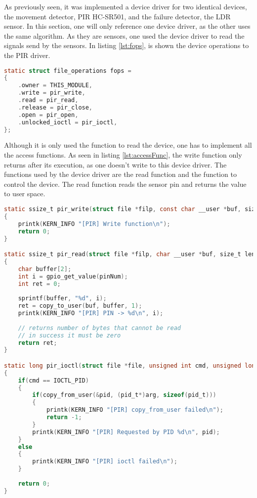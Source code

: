 %
As previously seen, it was implemented a device driver for two identical devices, the movement detector, PIR HC-SR501, and the failure detector, the LDR sensor. In this section, one will only reference one device driver, as the other uses the same algorithm. As they are sensors, one used the device driver to read the signals send by the sensors. In listing \ref{lst:fops}, is shown the device operations to the PIR driver.

\begin{lstlisting}[language=C, caption={Device Driver Operations.}, label={lst:fops}]
static struct file_operations fops = 
{
	.owner = THIS_MODULE,
	.write = pir_write,
	.read = pir_read,
	.release = pir_close,
	.open = pir_open,
	.unlocked_ioctl = pir_ioctl,
};
\end{lstlisting}

Although it is only used the function to read the device, one has to implement all the access functions. As seen in listing \ref{lst:accessFunc}, the write function only returns after its execution, as one doesn't write to this device driver. The functions used by the device driver are the read function and the function to control the device. The read function reads the sensor pin and returns the value to user space.

\begin{lstlisting}[language=C, caption={Device Driver access functions implementation.}, label={lst:accessFunc}]
static ssize_t pir_write(struct file *filp, const char __user *buf, size_t len, loff_t *off) 
{	
	printk(KERN_INFO "[PIR] Write function\n");
	return 0;
}

static ssize_t pir_read(struct file *filp, char __user *buf, size_t len, loff_t *off)
{
	char buffer[2];
	int i = gpio_get_value(pinNum);
	int ret = 0;
	
	sprintf(buffer, "%d", i);
	ret = copy_to_user(buf, buffer, 1);
	printk(KERN_INFO "[PIR] PIN -> %d\n", i);
	
	// returns number of bytes that cannot be read
	// in success it must be zero
	return ret;
}

static long pir_ioctl(struct file *file, unsigned int cmd, unsigned long arg)
{	
	if(cmd == IOCTL_PID)
	{
		if(copy_from_user(&pid, (pid_t*)arg, sizeof(pid_t))) 
		{
			printk(KERN_INFO "[PIR] copy_from_user failed\n"); 
			return -1;
		}
		printk(KERN_INFO "[PIR] Requested by PID %d\n", pid);
	}
	else
	{
		printk(KERN_INFO "[PIR] ioctl failed\n");	
	}
	
	return 0;
}
\end{lstlisting}

